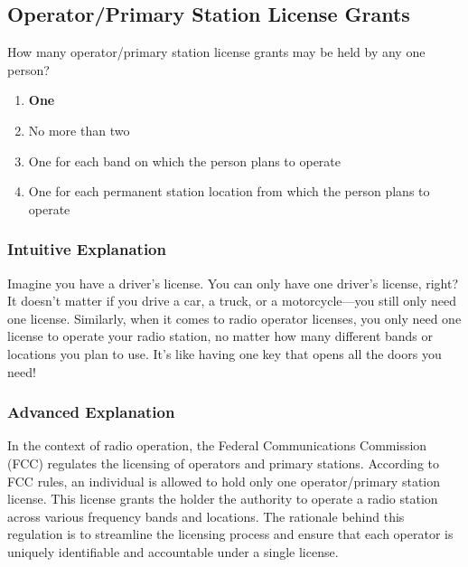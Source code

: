 \subsection{Operator/Primary Station License Grants}
\label{T1A04}

\begin{tcolorbox}[colback=gray!10!white,colframe=black!75!black,title=T1A04]
How many operator/primary station license grants may be held by any one person?
\begin{enumerate}[label=\Alph*)]
    \item \textbf{One}
    \item No more than two
    \item One for each band on which the person plans to operate
    \item One for each permanent station location from which the person plans to operate
\end{enumerate}
\end{tcolorbox}

\subsubsection{Intuitive Explanation}
Imagine you have a driver's license. You can only have one driver's license, right? It doesn't matter if you drive a car, a truck, or a motorcycle—you still only need one license. Similarly, when it comes to radio operator licenses, you only need one license to operate your radio station, no matter how many different bands or locations you plan to use. It's like having one key that opens all the doors you need!

\subsubsection{Advanced Explanation}
In the context of radio operation, the Federal Communications Commission (FCC) regulates the licensing of operators and primary stations. According to FCC rules, an individual is allowed to hold only one operator/primary station license. This license grants the holder the authority to operate a radio station across various frequency bands and locations. The rationale behind this regulation is to streamline the licensing process and ensure that each operator is uniquely identifiable and accountable under a single license. 

